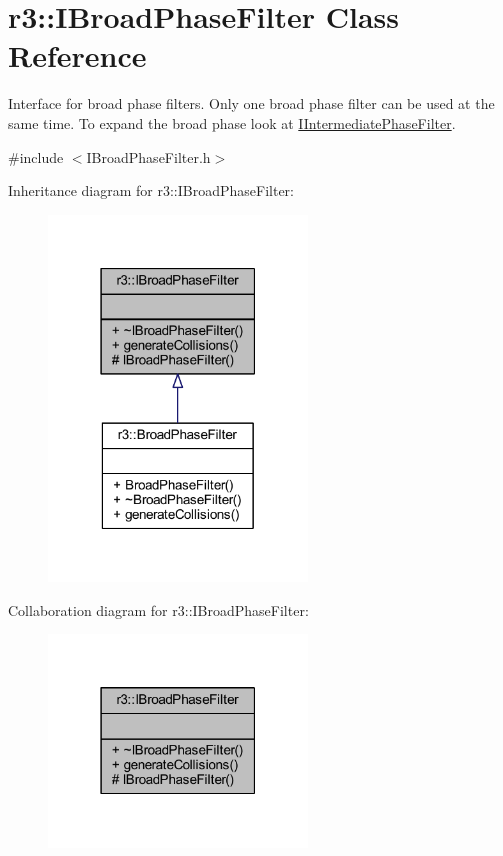\hypertarget{classr3_1_1_i_broad_phase_filter}{}\section{r3\+:\+:I\+Broad\+Phase\+Filter Class Reference}
\label{classr3_1_1_i_broad_phase_filter}


Interface for broad phase filters. Only one broad phase filter can be used at the same time. To expand the broad phase look at \mbox{\hyperlink{classr3_1_1_i_intermediate_phase_filter}{I\+Intermediate\+Phase\+Filter}}.  




{\ttfamily \#include $<$I\+Broad\+Phase\+Filter.\+h$>$}



Inheritance diagram for r3\+:\+:I\+Broad\+Phase\+Filter\+:\nopagebreak
\begin{figure}[H]
\begin{center}
\leavevmode
\includegraphics[width=195pt]{classr3_1_1_i_broad_phase_filter__inherit__graph}
\end{center}
\end{figure}


Collaboration diagram for r3\+:\+:I\+Broad\+Phase\+Filter\+:\nopagebreak
\begin{figure}[H]
\begin{center}
\leavevmode
\includegraphics[width=195pt]{classr3_1_1_i_broad_phase_filter__coll__graph}
\end{center}
\end{figure}
